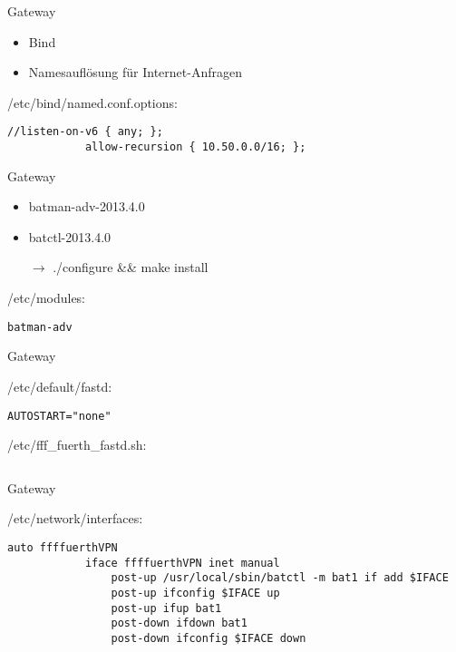 \begin{frame}[fragile]{Gateway}
    \begin{itemize}
        \item Bind
        \item Namesauflösung für Internet-Anfragen
    \end{itemize}

    \begin{block}{/etc/bind/named.conf.options:}
        \scriptsize
        \begin{lstlisting}[gobble=12]
            //listen-on-v6 { any; };
            allow-recursion { 10.50.0.0/16; };
        \end{lstlisting}
    \end{block}
\end{frame}


\begin{frame}[fragile]{Gateway}
    \begin{itemize}
        \item batman-adv-2013.4.0
        \item batctl-2013.4.0
        \item[$\rightarrow$] ./configure \&\& make install
    \end{itemize}

    \begin{block}{/etc/modules:}
        \scriptsize
        \begin{lstlisting}[gobble=12]
            batman-adv
        \end{lstlisting}
    \end{block}
\end{frame}

\begin{frame}[fragile]{Gateway}
    \begin{block}{/etc/default/fastd:}
        \scriptsize
        \begin{lstlisting}[gobble=12]
            AUTOSTART="none"
        \end{lstlisting}
    \end{block}
    \begin{block}{/etc/fff\_fuerth\_fastd.sh:}
        \scriptsize
        \begin{lstlisting}[gobble=12]
            %todo!
        \end{lstlisting}
    \end{block}
\end{frame}

\begin{frame}[fragile]{Gateway}
    \begin{block}{/etc/network/interfaces:}
        \scriptsize
        \begin{lstlisting}[gobble=12]
            auto ffffuerthVPN
            iface ffffuerthVPN inet manual
                post-up /usr/local/sbin/batctl -m bat1 if add $IFACE
                post-up ifconfig $IFACE up
                post-up ifup bat1
                post-down ifdown bat1
                post-down ifconfig $IFACE down
        \end{lstlisting}
    \end{block}
\end{frame}

